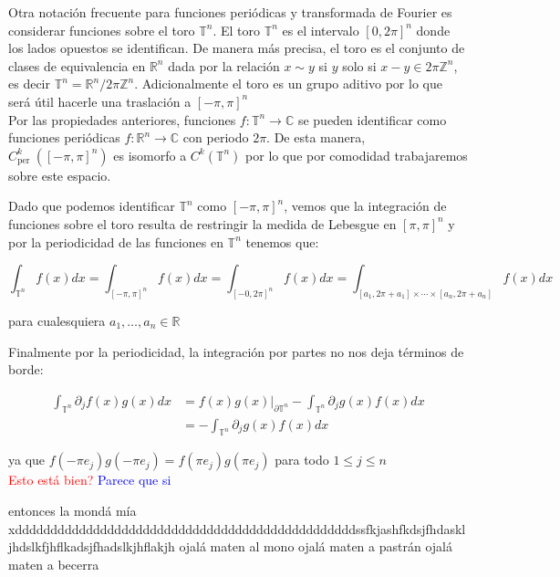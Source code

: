 \documentclass[12pt]{article}
\newcommand\R{\ensuremath{\mathbb{R}}}
\begin{document}
Otra notación frecuente para funciones periódicas y transformada de Fourier es considerar funciones sobre el toro $\mathbb{T}^n$. El toro $\mathbb{T}^n$ es el intervalo $[0,2 \pi]^n$ donde los lados opuestos se identifican. De manera más precisa, el toro es el conjunto de clases de equivalencia en $\mathbb{R}^n$ dada por la relación $x \sim y$ si $y$ solo si $x-y \in 2 \pi \mathbb{Z}^n$, es decir $\mathbb{T}^n=\mathbb{R}^n/ 2 \pi \mathbb{Z}^n$. Adicionalmente el toro es un grupo aditivo por lo que será útil hacerle una traslación a $[-\pi,\pi]^n$\\

Por las propiedades anteriores, funciones $f: \mathbb{T}^n \rightarrow \mathbb{C}$ se pueden identificar como funciones periódicas $f: \mathbb{R}^n \rightarrow \mathbb{C}$ con periodo $2 \pi$. De esta manera, $C_{\text {per }}^k([-\pi, \pi]^n)$ es isomorfo a $C^k(\mathbb{T}^n)$ por lo que por comodidad trabajaremos sobre este espacio. \cite{ogrianoc}\\

\begin{note}
    Dado que  podemos identificar $\mathbb{T}^n$ como $[-\pi,\pi]^n$, vemos que la integración de funciones sobre el toro resulta de restringir la medida de Lebesgue en $[\pi,\pi]^n$ y por la periodicidad de las funciones en $\mathbb{T}^n$ tenemos que:

    $$\int_{\mathbb{T}^n} f(x) d x=\int_{[-\pi,\pi]^n} f(x) d x=\int_{[-0,2\pi]^n} f(x) d x=\int_{\left[a_1, 2\pi+a_1\right] \times \cdots \times\left[a_n, 2\pi+a_n\right]} f(x) d x$$

    para cualesquiera $a_1,\ldots,a_n \in \R$\\
    

\end{note}

    Finalmente por la periodicidad, la integración por partes no nos deja términos de borde:

    \begin{align*}
        \int_{\mathbb{T}^n} \partial_j f(x) g(x) d x&=f(x)g(x)\big|_{\partial \mathbb{T}^n}-\int_{\mathbb{T}^n} \partial_j g(x) f(x) d x\\
        &=-\int_{\mathbb{T}^n} \partial_j g(x) f(x) d x
    \end{align*}

ya que $f(-\pi e_j)g(-\pi e_j)=f(\pi e_j)g(\pi e_j)$ para todo $1\leq j\leq n$\\

\textcolor{red}{Esto está bien?}
\textcolor{blue}{Parece que si}


\newpage



\nocite{*}


entonces la mondá mía xddddddddddddddddddddddddddddddddddddddddddddddddssfkjashfkdsjfhdaskljhdslkfjhflkadsjfhadslkjhflakjh ojalá maten al mono
ojalá maten a pastrán
ojalá maten a becerra
\end{document}

